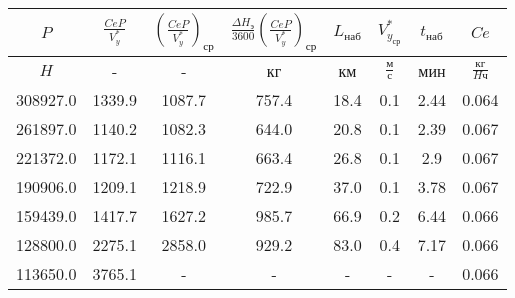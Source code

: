 \begin{tabular}{|c|c|c|c|c|c|c|c|}
\hline
$P$ & $\frac{CeP}{V_y^*}$ & $(\frac{CeP}{V_y^*})_{ср}$ & $\frac{\Delta H_э}{3600}(\frac{CeP}{V_y^*})_{ср}$ & $L_{наб}$ & $V_{y_{ср}}^*$ & $t_{наб}$ & $Ce$ \\ 
\hline
$H$ & - & - & кг & км & $\frac{м}{с}$ & мин & $\frac{кг}{H ч}$ \\ 
\hline
308927.0 & 1339.9 & 1087.7 & 757.4 & 18.4 & 0.1 & 2.44 & 0.064 \\ 
\hline
261897.0 & 1140.2 & 1082.3 & 644.0 & 20.8 & 0.1 & 2.39 & 0.067 \\ 
\hline
221372.0 & 1172.1 & 1116.1 & 663.4 & 26.8 & 0.1 & 2.9 & 0.067 \\ 
\hline
190906.0 & 1209.1 & 1218.9 & 722.9 & 37.0 & 0.1 & 3.78 & 0.067 \\ 
\hline
159439.0 & 1417.7 & 1627.2 & 985.7 & 66.9 & 0.2 & 6.44 & 0.066 \\ 
\hline
128800.0 & 2275.1 & 2858.0 & 929.2 & 83.0 & 0.4 & 7.17 & 0.066 \\ 
\hline
113650.0 & 3765.1 & - & - & - & - & - & 0.066 \\ 
\hline
\end{tabular}